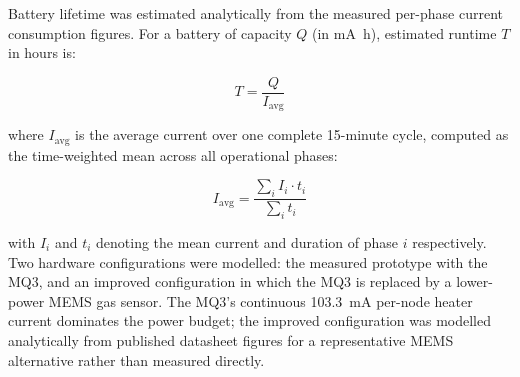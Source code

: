 Battery lifetime was estimated analytically from the measured per-phase current consumption figures. For a battery of capacity $Q$ (in \si{\milli\ampere\hour}), estimated runtime $T$ in hours is:

\begin{equation}
    T = \frac{Q}{I_{\text{avg}}}
    \label{eq:battery_lifetime}
\end{equation}

where $I_{\text{avg}}$ is the average current over one complete 15-minute cycle, computed as the time-weighted mean across all operational phases:

\begin{equation}
    I_{\text{avg}} = \frac{\displaystyle\sum_{i} I_i \cdot t_i}{\displaystyle\sum_{i} t_i}
    \label{eq:avg_current}
\end{equation}

with $I_i$ and $t_i$ denoting the mean current and duration of phase $i$ respectively. Two hardware configurations were modelled: the measured prototype with the MQ3, and an improved configuration in which the MQ3 is replaced by a lower-power MEMS gas sensor. The MQ3's continuous \SI{103.3}{\milli\ampere} per-node heater current dominates the power budget; the improved configuration was modelled analytically from published datasheet figures for a representative MEMS alternative rather than measured directly.
